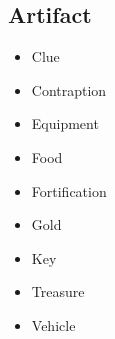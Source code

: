\documentclass{article}
\begin{document}
\subsection{Artifact}
\begin{multicols}{3}
    \begin{itemize}
        \item Clue
        \item Contraption
        \item Equipment
        \item Food
        \item Fortification
        \item Gold
        \item Key
        \item Treasure
        \item Vehicle
    \end{itemize}
\end{multicols}
\end{document}
